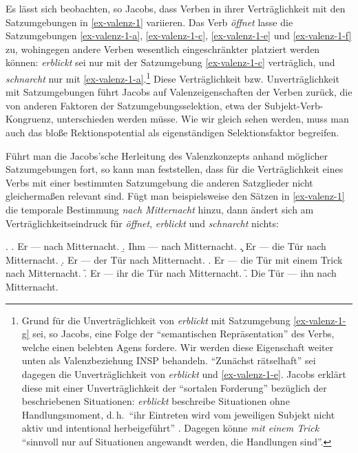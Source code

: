 Es lässt sich beobachten, so Jacobs, dass Verben in ihrer Verträglichkeit mit den Satzumgebungen in \ref{ex-valenz-1} variieren. Das Verb {\it öffnet} lasse die Satzumgebungen \ref{ex-valenz-1-a}, \ref{ex-valenz-1-c}, \ref{ex-valenz-1-e} und \ref{ex-valenz-1-f} zu, wohingegen andere Verben wesentlich eingeschränkter platziert werden können: {\it erblickt} sei nur mit der Satzumgebung \ref{ex-valenz-1-c} verträglich, und {\it schnarcht} nur mit \ref{ex-valenz-1-a}.\footnote{Grund für die Unverträglichkeit von {\it erblickt} mit Satzumgebung \ref{ex-valenz-1-g} sei, so Jacobs, eine Folge der "`semantischen Repräsentation"' des Verbs, welche einen belebten Agens fordere. Wir werden diese Eigenschaft weiter unten als Valenzbeziehung INSP behandeln. "`Zunächst rätselhaft"' sei dagegen die Unverträglichkeit von {\it erblickt} und \ref{ex-valenz-1-e}. Jacobs erklärt diese mit einer Unverträglichkeit der "`sortalen Forderung"' bezüglich der beschriebenen Situationen: {\it erblickt} beschreibe Situationen ohne Handlungsmoment, d.\,h.\ "`ihr Eintreten wird vom jeweiligen Subjekt nicht aktiv und intentional herbeigeführt"' \citep[382]{Jacobs:03}. Dagegen könne {\it mit einem Trick} "`sinnvoll nur auf Situationen angewandt werden, die Handlungen sind"'.} Diese Verträglichkeit bzw. Unverträglichkeit mit Satzumgebungen führt Jacobs auf Valenzeigenschaften der Verben zurück, die von anderen Faktoren der Satzumgebungsselektion, etwa der Subjekt-Verb-Kongruenz, unterschieden werden müsse. Wie wir gleich sehen werden, muss man auch das blo\ss e Rektionspotential als eigenständigen Selektionsfaktor begreifen. 

Führt man die Jacobs'sche Herleitung des Valenzkonzepts anhand möglicher Satzumgebungen fort, so kann man feststellen, dass für die Verträglichkeit eines Verbs mit einer bestimmten Satzumgebung die anderen Satzglieder nicht gleicherma\ss en relevant sind. Fügt man beispielsweise den Sätzen in \ref{ex-valenz-1} die temporale Bestimmung {\it nach Mitternacht} hinzu, dann ändert sich am Verträglichkeitseindruck für {\it öffnet}, {\it erblickt} und {\it schnarcht} nichts:

\ex. \label{ex-valenz-2}
\a. \label{ex-valenz-2-a} Er --- nach Mitternacht.
\b. \label{ex-valenz-2-b} Ihm --- nach Mitternacht.
\c. \label{ex-valenz-2-c} Er --- die Tür nach Mitternacht.
\d. \label{ex-valenz-2-d} Er --- der Tür nach Mitternacht.
\e. \label{ex-valenz-2-e} Er --- die Tür mit einem Trick nach Mitternacht.
\f. \label{ex-valenz-2-f} Er --- ihr die Tür nach Mitternacht.
\f. \label{ex-valenz-2-g} Die Tür --- ihn nach Mitternacht.


